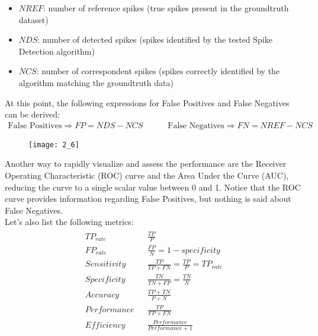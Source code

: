 \begin{itemize}
    \item \(NREF\): number of reference spikes (true spikes present in
    the groundtruth dataset)
    \item \(NDS\): number of detected spikes (spikes identified by the
    tested Spike Detection algorithm)
    \item \(NCS\): number of correspondent spikes (spikes correctly
    identified by the algorithm matching the groundtruth data)
\end{itemize}
At this point, the following expressions for False Positives and False Negatives
can be derived:
\begin{align*}
    \text{False Positives}\Rightarrow FP=NDS-NCS
    \quad\quad\quad
    \text{False Negatives}\Rightarrow FN=NREF-NCS
\end{align*}
\begin{figure}[H]
    \texttt{[image: 2\_6]}
    \centering
\end{figure}
Another way to rapidly visualize and assess the performance are the Receiver
Operating Characteristic (ROC) curve and the Area Under the Curve (AUC), reducing
the curve to a single scalar value between 0 and 1. Notice that the ROC curve
provides information regarding False Positives, but nothing is said about
False Negatives.\\
Let's also list the following metrics:
\begin{align*}
    \begin{matrix}
        TP_{rate} && \frac{TP}{P}\\
        FP_{rate} && \frac{FP}{N}=1-specificity\\
        Sensitivity && \frac{TP}{TP+FN}=\frac{TP}{P}=TP_{rate}\\
        Specificity && \frac{TN}{TN+FP}=\frac{TN}{N}\\
        Accuracy && \frac{TP+TN}{P+N}\\
        Performance && \frac{TP}{FP+FN}\\
        Efficiency && \frac{Performance}{Performance+1}
    \end{matrix}
\end{align*}